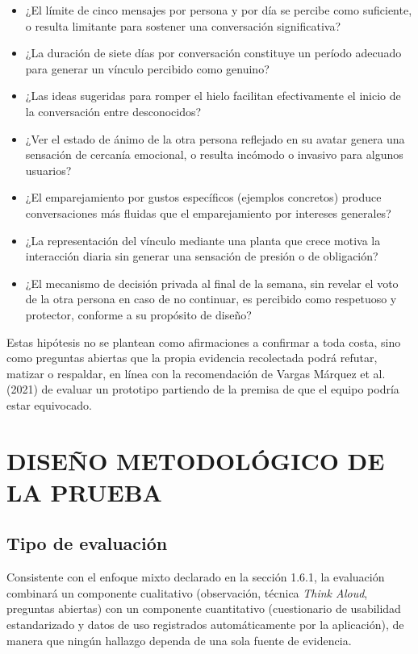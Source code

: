 \begin{itemize}
    \item ¿El límite de cinco mensajes por persona y por día se percibe como suficiente, o resulta limitante para sostener una conversación significativa?
    \item ¿La duración de siete días por conversación constituye un período adecuado para generar un vínculo percibido como genuino?
    \item ¿Las ideas sugeridas para romper el hielo facilitan efectivamente el inicio de la conversación entre desconocidos?
    \item ¿Ver el estado de ánimo de la otra persona reflejado en su avatar genera una sensación de cercanía emocional, o resulta incómodo o invasivo para algunos usuarios?
    \item ¿El emparejamiento por gustos específicos (ejemplos concretos) produce conversaciones más fluidas que el emparejamiento por intereses generales?
    \item ¿La representación del vínculo mediante una planta que crece motiva la interacción diaria sin generar una sensación de presión o de obligación?
    \item ¿El mecanismo de decisión privada al final de la semana, sin revelar el voto de la otra persona en caso de no continuar, es percibido como respetuoso y protector, conforme a su propósito de diseño?
\end{itemize}

Estas hipótesis no se plantean como afirmaciones a confirmar a toda costa, sino como preguntas abiertas que la propia evidencia recolectada podrá refutar, matizar o respaldar, en línea con la recomendación de Vargas Márquez et al. (2021) de evaluar un prototipo partiendo de la premisa de que el equipo podría estar equivocado.

\section{DISEÑO METODOLÓGICO DE LA PRUEBA}
\subsection{Tipo de evaluación}
Consistente con el enfoque mixto declarado en la sección 1.6.1, la evaluación combinará un componente cualitativo (observación, técnica \textit{Think Aloud}, preguntas abiertas) con un componente cuantitativo (cuestionario de usabilidad estandarizado y datos de uso registrados automáticamente por la aplicación), de manera que ningún hallazgo dependa de una sola fuente de evidencia.

